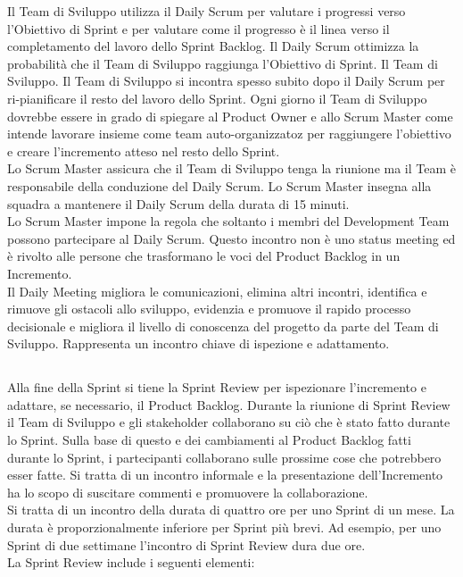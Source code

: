 Il Team di Sviluppo utilizza il Daily Scrum per valutare i progressi verso l'Obiettivo di Sprint e per valutare come il progresso \`e il 
linea verso il completamento del lavoro dello Sprint Backlog. Il Daily Scrum ottimizza la probabilit\`a che il Team di Sviluppo raggiunga 
l'Obiettivo di Sprint. Il Team di Sviluppo. Il Team di Sviluppo si incontra spesso subito dopo il Daily Scrum per ri-pianificare il resto 
del lavoro dello Sprint. Ogni giorno il Team di Sviluppo dovrebbe essere in grado di spiegare al Product Owner e allo Scrum Master come 
intende lavorare insieme come team auto-organizzatoz per raggiungere l'obiettivo e creare l'incremento atteso nel resto dello Sprint. \newline
\\Lo Scrum Master assicura che il Team di Sviluppo tenga la riunione ma il Team \`e responsabile della conduzione del Daily Scrum.  Lo
Scrum Master insegna alla squadra a mantenere il Daily Scrum della durata di 15 minuti. \newline
\\Lo Scrum Master impone la regola che soltanto i membri del Development Team possono partecipare al Daily Scrum. Questo incontro non \`e 
uno status meeting ed \`e rivolto alle persone che trasformano le voci del Product Backlog in un Incremento. \newline
\\ Il Daily Meeting migliora le comunicazioni, elimina altri incontri, identifica e rimuove gli ostacoli allo sviluppo, evidenzia e 
promuove il rapido processo decisionale e migliora il livello di conoscenza del progetto da parte del Team di Sviluppo. Rappresenta un 
incontro chiave di ispezione e adattamento.


\subsection*{\color{SteelBlue}{Sprint Review}}%
\label{sec:sprint_review}
Alla fine della Sprint si tiene la Sprint Review per ispezionare l'incremento e adattare, se necessario, il Product Backlog. 
Durante la riunione di Sprint Review il Team di Sviluppo e gli stakeholder collaborano su ci\`o che \`e stato fatto durante lo Sprint. 
Sulla base di questo e dei cambiamenti al Product Backlog fatti durante lo Sprint, i partecipanti collaborano sulle prossime cose che 
potrebbero esser fatte. Si tratta di un incontro informale e la presentazione dell'Incremento ha lo scopo di suscitare commenti e 
promuovere la collaborazione. \newline
\\Si tratta di un incontro della durata di quattro ore per uno Sprint di un mese. La durata \`e proporzionalmente inferiore per Sprint 
pi\`u brevi. Ad esempio, per uno Sprint di due settimane l'incontro di Sprint Review dura due ore. \newline
\\La Sprint Review include i seguenti elementi:

